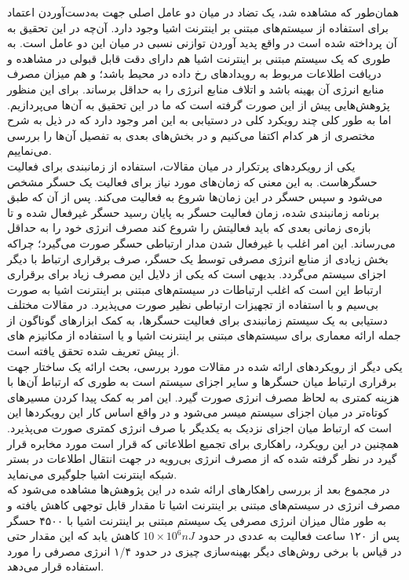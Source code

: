 همان‌طور که مشاهده شد، یک تضاد در میان دو عامل اصلی جهت به‌دست‌آوردن اعتماد برای استفاده از سیستم‌های مبتنی بر اینترنت اشیا وجود دارد. آن‌چه در این تحقیق به آن پرداخته شده است در واقع پدید آوردن توازنی نسبی در میان این دو عامل است. به طوری که یک سیستم مبتنی بر اینترنت اشیا هم دارای دقت قابل قبولی در مشاهده و دریافت اطلاعات مربوط به رویدادهای رخ داده در محیط باشد؛ و هم میزان مصرف منابع انرژی آن بهینه باشد و اتلاف منابع انرژی را به حداقل برساند. برای این منظور پژوهش‌هایی پیش از این صورت گرفته است که ما در این تحقیق به آن‌ها می‌پردازیم. اما به طور کلی چند رویکرد کلی در دستیابی به این امر وجود دارد که در ذیل به شرح مختصری از هر کدام اکتفا می‌کنیم و در بخش‌های بعدی به تفصیل آن‌ها را بررسی می‌نماییم.\\
یکی از رویکردهای پرتکرار در میان مقالات، استفاده از زمانبندی برای فعالیت حسگرهاست. به این معنی که زمان‌های مورد نیاز برای فعالیت یک حسگر مشخص می‌شود و سپس حسگر در این زمان‌ها شروع به فعالیت می‌کند. پس از آن که طبق برنامه زمانبندی شده، زمان فعالیت حسگر به پایان رسید حسگر غیرفعال شده و تا بازه‌ی زمانی بعدی که باید فعالیتش را شروع کند مصرف انرژی خود را به حداقل می‌رساند. این امر اغلب با غیرفعال شدن مدار ارتباطی حسگر صورت می‌گیرد؛ چراکه بخش زیادی از منابع انرژی مصرفی توسط یک حسگر، صرف برقراری ارتباط با دیگر اجزای سیستم می‌گردد. بدیهی است که یکی از دلایل این مصرف زیاد برای برقراری ارتباط این است که اغلب ارتباطات در سیستم‌های مبتنی بر اینترنت اشیا به صورت بی‌سیم و با استفاده از تجهیزات ارتباطی نظیر  صورت می‌پذیرد. در مقالات مختلف دستیابی به یک سیستم زمانبندی برای فعالیت حسگرها، به کمک ابزارهای گوناگون از جمله ارائه معماری برای سیستم‌های مبتنی بر اینترنت اشیا و یا استفاده از مکانیزم های از پیش تعریف شده تحقق یافته است.\\
یکی دیگر از رویکردهای ارائه شده در مقالات مورد بررسی، بحث ارائه یک ساختار جهت برقراری ارتباط میان حسگرها و سایر اجزای سیستم است به طوری که ارتباط آن‌ها با هزینه کمتری به لحاظ مصرف انرژی صورت گیرد. این امر به کمک پیدا کردن مسیرهای کوتاه‌تر در میان اجزای سیستم میسر می‌شود و در واقع اساس کار این رویکردها این است که ارتباط میان اجزای نزدیک به یکدیگر با صرف انرژی کمتری صورت می‌پذیرد. همچنین در این رویکرد، راهکاری برای تجمیع اطلاعاتی که قرار است مورد مخابره قرار گیرد در نظر گرفته شده که از مصرف انرژی بی‌رویه در جهت انتقال اطلاعات در بستر شبکه اینترنت اشیا جلوگیری می‌نماید.\\
در مجموع بعد از بررسی راهکارهای ارائه شده در این پژوهش‌ها مشاهده می‌شود که مصرف انرژی در سیستم‌های مبتنی بر اینترنت اشیا تا مقدار قابل توجهی کاهش یافته و به طور مثال میزان انرژی مصرفی یک سیستم مبتنی بر اینترنت اشیا با ۴۵۰۰ حسگر پس از ۱۲۰ ساعت فعالیت به عددی در حدود $10 \times 10^6 nJ$ کاهش یابد که این مقدار حتی در قیاس با برخی روش‌های دیگر بهینه‌سازی چیزی در حدود ۱/۴ انرژی مصرفی را مورد استفاده قرار می‌دهد.\\
